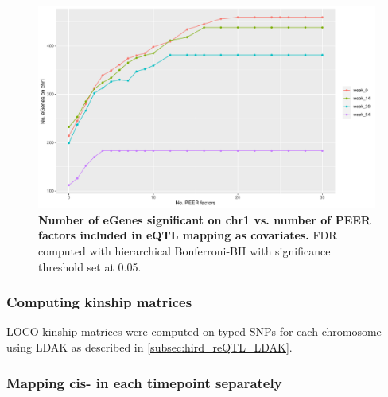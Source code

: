 \begin{figure}
    \centering
    \includegraphics[width=1.0\textwidth,page=1]{mainmatter/figures/chapter_04/count_eGenes.signif_eGenes_vs_PEER_n.dataset_multiPANTS.chr_1.pdf}
    \caption{
        \textbf{Number of eGenes significant on chr1 vs. number of PEER factors included in \gls{eQTL} mapping as covariates.}
        \gls{FDR} computed with hierarchical Bonferroni-\gls{BH} \autocite{huang2018PowerFalseDiscovery} with significance threshold set at 0.05.
    }
    \label{fig:multipants_reqtl_PEER_k_choice}
\end{figure}

\subsubsection{Computing kinship matrices}

\Gls{LOCO} kinship matrices were computed on typed \glspl{SNP} for each chromosome using LDAK as described in \cref{subsec:hird_reQTL_LDAK}.

\subsubsection{Mapping cis- in each timepoint separately}

